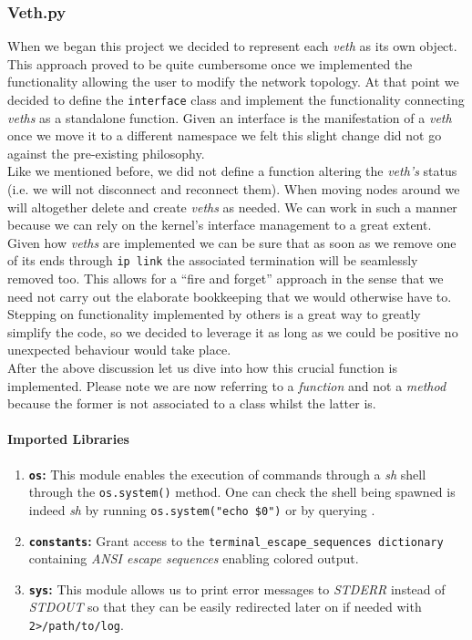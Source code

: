 \subsubsection{Veth.py}
    When we began this project we decided to represent each \textit{veth} as its own object. This approach proved to be quite cumbersome once we implemented the functionality allowing the user to modify the network topology. At that point we decided to define the \texttt{interface} class and implement the functionality connecting \textit{veths} as a standalone function. Given an interface is the manifestation of a \textit{veth} once we move it to a different namespace we felt this slight change did not go against the pre-existing philosophy.\\

    Like we mentioned before, we did not define a function altering the \textit{veth's} status (i.e. we will not disconnect and reconnect them). When moving nodes around we will altogether delete and create \textit{veths} as needed. We can work in such a manner because we  can rely on the kernel's interface management to a great extent. Given how \textit{veths} are implemented we can be sure that as soon as we remove one of its ends through \texttt{ip link} the associated termination will be seamlessly removed too. This allows for a ``fire and forget'' approach in the sense that we need not carry out the elaborate bookkeeping that we would otherwise have to. Stepping on functionality implemented by others is a great way to greatly simplify the code, so we decided to leverage it as long as we could be positive no unexpected behaviour would take place.\\

    After the above discussion let us dive into how this crucial function is implemented. Please note we are now referring to a \textit{function} and not a \textit{method} because the former is not associated to a class whilst the latter is.\\

    \paragraph{Imported Libraries}
        \begin{enumerate}
            \item \textbf{\texttt{os}:} This module enables the execution of commands through a \textit{sh} shell through the \texttt{os.system()} method. One can check the shell being spawned is indeed \textit{sh} by running \texttt{\allowbreak os.system("echo \$0")} or by querying \cite{bib:man-system}.
            \item \textbf{\texttt{constants}:} Grant access to the \texttt{\allowbreak terminal\_escape\_sequences dictionary} containing \textit{ANSI escape sequences} enabling colored output.
            \item \textbf{\texttt{sys}:} This module allows us to print error messages to \textit{STDERR} instead of \textit{STDOUT} so that they can be easily redirected later on if needed with \texttt{2>/path/to/log}.
        \end{enumerate}

